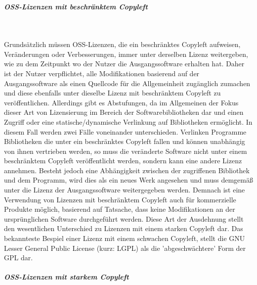 \subparagraph{OSS-Lizenzen mit beschränktem Copyleft}$~$

Grundsätzlich müssen OSS-Lizenzen, die ein beschränktes Copyleft aufweisen, Veränderungen oder Verbesserungen, immer unter derselben Lizenz weitergeben, wie zu dem Zeitpunkt wo der Nutzer die Ausgangssoftware erhalten hat. \cite[S. 18]{bitkom_open_2016} Daher ist der Nutzer verpflichtet, alle Modifikationen basierend auf der Ausgangssoftware als einen Quellcode für die Allgemeinheit zugänglich zumachen und diese ebenfalls unter dieselbe Lizenz mit beschränktem Copyleft zu veröffentlichen. Allerdings gibt es Abstufungen, da im Allgemeinen der Fokus dieser Art von Lizensierung im Bereich der Softwarebibliotheken dar und einen Zugriff oder eine statische/dynamische Verlinkung auf Bibliotheken ermöglicht. In diesem Fall werden zwei Fälle voneinander unterschieden. Verlinken Programme Bibliotheken die unter ein beschränktes Copyleft fallen und können unabhängig von ihnen vertrieben werden, so muss die veränderte Software nicht unter einem beschränktem Copyleft veröffentlicht werden, sondern kann eine andere Lizenz annehmen. \cite[S. 35 - 38]{schaaf_open-source-lizenzen_2013} Besteht jedoch eine Abhängigkeit zwischen der zugriffenen Bibliothek und dem Programm, wird dies als ein neues Werk angesehen und muss demgemäß unter die Lizenz der Ausgangssoftware weitergegeben werden. Demnach ist eine Verwendung von Lizenzen mit beschränktem Copyleft auch für kommerzielle Produkte möglich, basierend auf Tatsache, dass keine Modifikationen an der ursprünglichen Software durchgeführt werden.\cite[S. 21]{renner_open_2006} Diese Art der Ausdehnung stellt den wesentlichen Unterschied zu Lizenzen mit einem starken Copyleft dar. Das bekannteste Bespiel einer Lizenz mit einem schwachen Copyleft, stellt die GNU Lesser General Public License (kurz: LGPL) als die 'abgeschwächtere' Form der GPL dar. 

\subparagraph{OSS-Lizenzen mit starkem Copyleft}$~$

